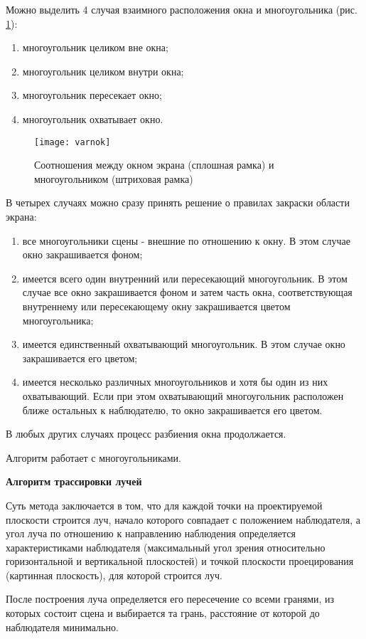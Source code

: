 Можно выделить 4 случая взаимного расположения окна и многоугольника (рис. \ref{img:varnok}):
\begin{enumerate}
	\item многоугольник целиком вне окна;
	\item многоугольник целиком внутри окна;
	\item многоугольник пересекает окно;
	\item многоугольник охватывает окно.
\end{enumerate}

\begin{figure}[H]
	\centering
	\texttt{[image: varnok]}
	\caption{Соотношения между окном экрана (сплошная рамка) и многоугольником (штриховая рамка)}
	\label{img:varnok}
\end{figure}

В четырех случаях можно сразу принять решение о правилах закраски области экрана:
\begin{enumerate}
	\item все многоугольники сцены - внешние по отношению к окну. В этом случае окно закрашивается фоном;
	\item имеется всего один внутренний или пересекающий многоугольник. В этом случае все окно закрашивается фоном и затем часть окна, соответствующая внутреннему или пересекающему окну закрашивается цветом многоугольника;
	\item имеется единственный охватывающий многоугольник. В этом случае окно закрашивается его цветом;
	\item имеется несколько различных многоугольников и хотя бы один из них охватывающий. Если при этом охватывающий многоугольник расположен ближе остальных к наблюдателю, то окно закрашивается его цветом.
\end{enumerate}
В любых других случаях процесс разбиения окна продолжается.

Алгоритм работает с многоугольниками. 

\textbf{Алгоритм трассировки лучей }

Суть метода заключается в том, что для каждой точки на проектируемой плоскости строится луч, начало которого совпадает с положением наблюдателя, а угол луча по отношению к направлению наблюдения определяется характеристиками наблюдателя (максимальный угол зрения относительно горизонтальной и вертикальной плоскостей) и точкой плоскости проецирования (картинная плоскость), для которой строится луч. 

После построения луча определяется его пересечение со всеми гранями, из которых состоит сцена и выбирается та грань, расстояние от которой до наблюдателя минимально.

